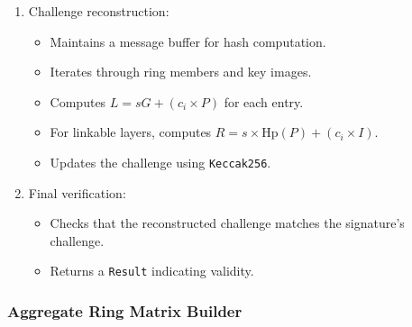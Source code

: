\documentclass[12pt,a4paper]{article}
\begin{document}
\begin{description}
\begin{enumerate}
  \item Challenge reconstruction:
    \begin{itemize}
      \item Maintains a message buffer for hash computation.
      \item Iterates through ring members and key images.
      \item Computes \(L = sG + (c_i \times P)\) for each entry.
      \item For linkable layers, computes \(R = s \times \mathrm{Hp}(P) + (c_i \times I)\).
      \item Updates the challenge using \texttt{Keccak256}.
    \end{itemize}

  \item Final verification:
    \begin{itemize}
      \item Checks that the reconstructed challenge matches the signature's challenge.
      \item Returns a \texttt{Result} indicating validity.
    \end{itemize}
\end{enumerate}
\end{description}

\subsubsection{Aggregate Ring Matrix Builder}
\label{subsubsec:aggregate-builder}
\end{document}
